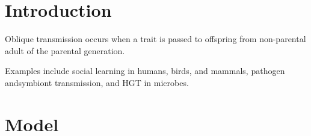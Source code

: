 \documentclass[a0,landscape]{a0poster}
\begin{document}
\vspace{4cm} %


\begin{multicols}{4} %


%
%
%


\color{DarkSlateGray}

\section*{Introduction}

Oblique transmission occurs when a trait is passed to offspring from non-parental adult of the parental generation.

Examples include social learning in humans, birds, and mammals, pathogen andsymbiont transmission, and HGT in microbes.


\section*{Model}


\end{multicols}
\end{document}
